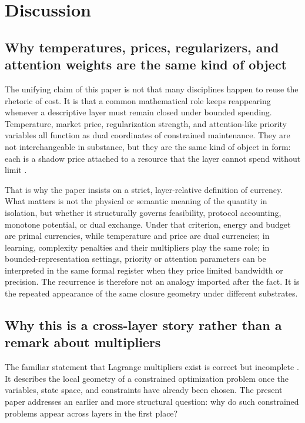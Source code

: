 \section{Discussion}\label{sec:discussion}

\subsection{Why temperatures, prices, regularizers, and attention weights are the same kind of object}

The unifying claim of this paper is not that many disciplines happen to reuse the rhetoric of cost. It is that a common mathematical role keeps reappearing whenever a descriptive layer must remain closed under bounded spending. Temperature, market price, regularization strength, and attention-like priority variables all function as dual coordinates of constrained maintenance. They are not interchangeable in substance, but they are the same kind of object in form: each is a shadow price attached to a resource that the layer cannot spend without limit \cite{jaynes1957information,arrowdebreu1954,sims2003rationalinattention}.

That is why the paper insists on a strict, layer-relative definition of currency. What matters is not the physical or semantic meaning of the quantity in isolation, but whether it structurally governs feasibility, protocol accounting, monotone potential, or dual exchange. Under that criterion, energy and budget are primal currencies, while temperature and price are dual currencies; in learning, complexity penalties and their multipliers play the same role; in bounded-representation settings, priority or attention parameters can be interpreted in the same formal register when they price limited bandwidth or precision. The recurrence is therefore not an analogy imported after the fact. It is the repeated appearance of the same closure geometry under different substrates.

\subsection{Why this is a cross-layer story rather than a remark about multipliers}

The familiar statement that Lagrange multipliers exist is correct but incomplete \cite{boyd2004convex}. It describes the local geometry of a constrained optimization problem once the variables, state space, and constraints have already been chosen. The present paper addresses an earlier and more structural question: why do such constrained problems appear across layers in the first place?

